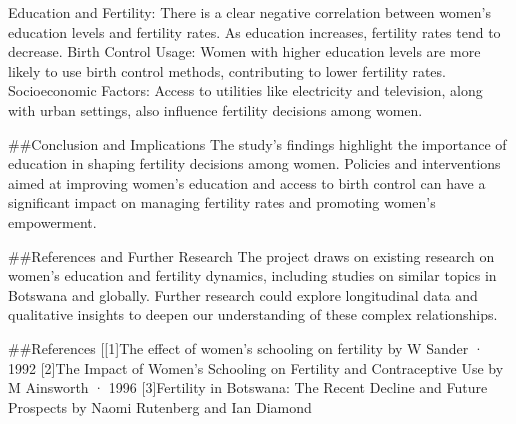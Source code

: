 \documentclass[
  letterpaper,
  DIV=11,
  numbers=noendperiod]{scrartcl}
\begin{document}
Education and Fertility: There is a clear negative correlation between
women's education levels and fertility rates. As education increases,
fertility rates tend to decrease. Birth Control Usage: Women with higher
education levels are more likely to use birth control methods,
contributing to lower fertility rates. Socioeconomic Factors: Access to
utilities like electricity and television, along with urban settings,
also influence fertility decisions among women.

\#\#Conclusion and Implications The study's findings highlight the
importance of education in shaping fertility decisions among women.
Policies and interventions aimed at improving women's education and
access to birth control can have a significant impact on managing
fertility rates and promoting women's empowerment.

\#\#References and Further Research The project draws on existing
research on women's education and fertility dynamics, including studies
on similar topics in Botswana and globally. Further research could
explore longitudinal data and qualitative insights to deepen our
understanding of these complex relationships.

\#\#References {[}{[}1{]}The effect of women's schooling on fertility by
W Sander · 1992 {[}2{]}The Impact of Women's Schooling on Fertility and
Contraceptive Use by M Ainsworth · 1996 {[}3{]}Fertility in Botswana:
The Recent Decline and Future Prospects by Naomi Rutenberg and Ian
Diamond
\end{document}
